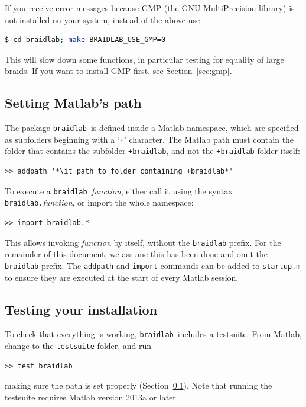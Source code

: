 \documentclass[12pt]{article}
\newcommand{\braidlab}{\texttt{braidlab}}%
\begin{document}
%
If you receive error messages because \href{https://gmplib.org/}{GMP} (the GNU
MultiPrecision library) is not installed on your system, instead of the above
use
\begin{lstlisting}[frame=single,framerule=0pt,escapechar=*,%
  language=bash,backgroundcolor=\color{white}]
$ cd braidlab; make BRAIDLAB_USE_GMP=0
\end{lstlisting}
This will slow down some functions, in particular testing for equality of
large braids.  If you want to install GMP first, see Section~\ref{sec:gmp}.

%


\subsection{Setting Matlab's path}
\label{sec:path}

\lstset{language=Matlab}
\lstset{breaklines=true}

The package \braidlab\ is defined inside a Matlab namespace,
 which are specified as subfolders beginning with a
`\lstinline{+}' character.  The Matlab path  must contain
the folder that contains the subfolder \lstinline{+braidlab}, and not the
\lstinline{+braidlab} folder itself:
\begin{lstlisting}[frame=single,framerule=0pt,escapechar=*]
>> addpath '*\it path to folder containing +braidlab*'
\end{lstlisting}
To execute a \braidlab\ \textit{function}, either call it using the syntax
\hbox{\lstinline{braidlab.}\textit{function}}, or import the whole namespace:
\begin{lstlisting}[frame=single,framerule=0pt]
>> import braidlab.*
\end{lstlisting}
This allows invoking \textit{function} by itself, without the
\lstinline{braidlab} prefix.  For the remainder of this document, we
assume this has been done and omit the \lstinline{braidlab} prefix.
The \lstinline{addpath} and \lstinline{import} commands can be added
to \lstinline{startup.m} to ensure they are executed at the start of
every Matlab session.


\subsection{Testing your installation}

To check that everything is working, \braidlab\ includes a testsuite.  From
Matlab, change to the \lstinline{testsuite} folder, and run
\begin{lstlisting}[frame=single,framerule=0pt]
>> test_braidlab
\end{lstlisting}
making sure the path is set properly (Section~\ref{sec:path}).
Note that running the testsuite requires Matlab version 2013a or later.
\end{document}
